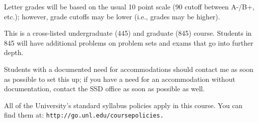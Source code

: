 \documentclass{amsart}
\begin{document}
\noindent Letter grades will be based on the usual 10 point scale (90 cutoff between A-/B+, etc.); however, grade cutoffs may be lower (i.e., grades may be higher).

\medskip

 This is a cross-listed undergraduate (445) and graduate (845) course. Students in 845 will have additional problems on problem sets and exams that go into further depth. 

\medskip


 Students with a documented need for accommodations should contact me as soon as possible to set this up; if you have a need for an accommodation without documentation, contact the SSD office as soon as possible as well.

\medskip

 All of the University's standard syllabus policies apply in this course. You can find them at:
\tt{http://go.unl.edu/coursepolicies}.

\vfill
\pagebreak
\smallskip
%
\end{document}
